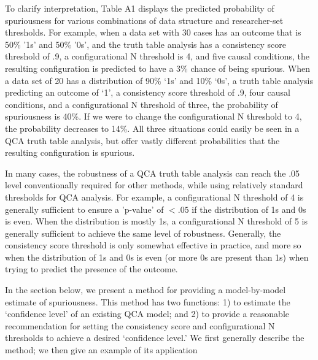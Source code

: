 \documentclass[12pt]{article}
\begin{document}
{To clarify interpretation, Table A1 displays the predicted probability of spuriousness for various combinations of data structure and researcher-set thresholds. For example, when a data set with 30 cases has an outcome that is 50\% '1s' and 50\% '0s', and the truth table analysis has a consistency score threshold of .9, a configurational N threshold is 4, and five causal conditions, the resulting configuration is predicted to have a 3\% chance of being spurious. When a data set of 20 has a distribution of 90\% `1s' and 10\% `0s', a truth table analysis predicting an outcome of `1', a consistency score threshold of .9, four causal conditions, and a configurational N threshold of three, the probability of spuriousness is 40\%. If we were to change the configurational N threshold to 4, the probability decreases to 14\%. All three situations could easily be seen in a QCA truth table analysis, but offer vastly different probabilities that the resulting configuration is spurious.

In many cases, the robustness of a QCA truth table analysis can reach the .05 level conventionally required for other methods, while using relatively standard thresholds for QCA analysis. For example, a configurational N threshold of 4 is generally sufficient to ensure a 'p-value' of $<.05$ if the distribution of 1s and 0s is even. When the distribution is mostly 1s, a configurational N threshold of 5 is generally sufficient to achieve the same level of robustness. Generally, the consistency score threshold is only somewhat effective in practice, and more so when the distribution of 1s and 0s is even (or more 0s are present than 1s) when trying to predict the presence of the outcome.


In the section below, we present a method for providing a model-by-model estimate of spuriousness. This method has two functions: 1) to estimate the `confidence level' of an existing QCA model; and 2) to provide a reasonable recommendation for setting the consistency score and configurational N thresholds to achieve a desired `confidence level.' We first generally describe the method; we then give an example of its application 


}
\end{document}
